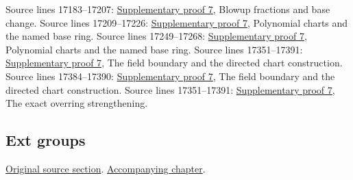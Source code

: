 \begin{AlgebraSourceRoutes}
 Source lines 17183--17207: \hyperlink{algebra_blowup_ext_depth_notes_20260927}{Supplementary proof 7}, Blowup fractions and base change.
 Source lines 17209--17226: \hyperlink{algebra_blowup_ext_depth_notes_20260927}{Supplementary proof 7}, Polynomial charts and the named base ring.
 Source lines 17249--17268: \hyperlink{algebra_blowup_ext_depth_notes_20260927}{Supplementary proof 7}, Polynomial charts and the named base ring.
 Source lines 17351--17391: \hyperlink{algebra_blowup_ext_depth_notes_20260927}{Supplementary proof 7}, The field boundary and the directed chart construction.
 Source lines 17384--17390: \hyperlink{algebra_blowup_ext_depth_notes_20260927}{Supplementary proof 7}, The field boundary and the directed chart construction.
 Source lines 17351--17391: \hyperlink{algebra_blowup_ext_depth_notes_20260927}{Supplementary proof 7}, The exact overring strengthening.
\end{AlgebraSourceRoutes}

\subsection{Ext groups}
\hypertarget{algebra-source-section-ext}{}
\noindent\href{https://github.com/stacks/stacks-project/blob/a04446e57ec1fbc252a871afcec7752fb2807b14/algebra.tex\#L17402}{Original source section}. \href{algebra.pdf\#nameddest=section-ext}{Accompanying chapter}.

